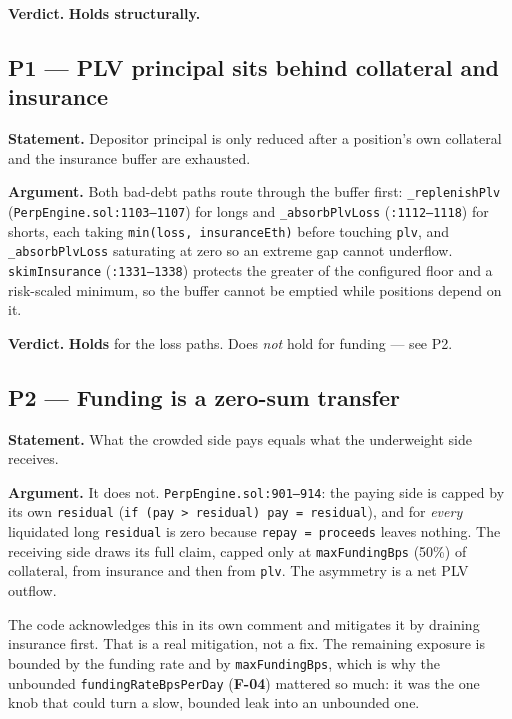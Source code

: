 \documentclass[11pt,a4paper]{article}
\newcommand{\code}[1]{\texttt{\small #1}}
\newcommand{\fileref}[1]{\texttt{\scriptsize #1}}
\begin{document}
\textbf{Verdict.} \textcolor{good}{\textbf{Holds structurally.}}

\subsection*{P1 --- PLV principal sits behind collateral and insurance}
\textbf{Statement.} Depositor principal is only reduced after a position's own
collateral and the insurance buffer are exhausted.

\textbf{Argument.} Both bad-debt paths route through the buffer first:
\code{\_replenishPlv} (\fileref{PerpEngine.sol:1103--1107}) for longs and
\code{\_absorbPlvLoss} (\fileref{:1112--1118}) for shorts, each taking
\code{min(loss, insuranceEth)} before touching \code{plv}, and \code{\_absorbPlvLoss}
saturating at zero so an extreme gap cannot underflow. \code{skimInsurance}
(\fileref{:1331--1338}) protects the greater of the configured floor and a
risk-scaled minimum, so the buffer cannot be emptied while positions depend on it.

\textbf{Verdict.} \textcolor{good}{\textbf{Holds}} for the loss paths.
\textcolor{medium}{Does \emph{not} hold for funding} --- see P2.

\subsection*{P2 --- Funding is a zero-sum transfer}
\textbf{Statement.} What the crowded side pays equals what the underweight side
receives.

\textbf{Argument.} It does not. \fileref{PerpEngine.sol:901--914}: the paying side
is capped by its own \code{residual} (\code{if (pay > residual) pay = residual}),
and for \emph{every} liquidated long \code{residual} is zero because
\code{repay = proceeds} leaves nothing. The receiving side draws its full claim,
capped only at \code{maxFundingBps} (50\%) of collateral, from insurance and then
from \code{plv}. The asymmetry is a net PLV outflow.

The code acknowledges this in its own comment and mitigates it by draining
insurance first. That is a real mitigation, not a fix. The remaining exposure is
bounded by the funding rate and by \code{maxFundingBps}, which is why the
unbounded \code{fundingRateBpsPerDay} (\textbf{F-04}) mattered so much: it was the
one knob that could turn a slow, bounded leak into an unbounded one.
\end{document}
